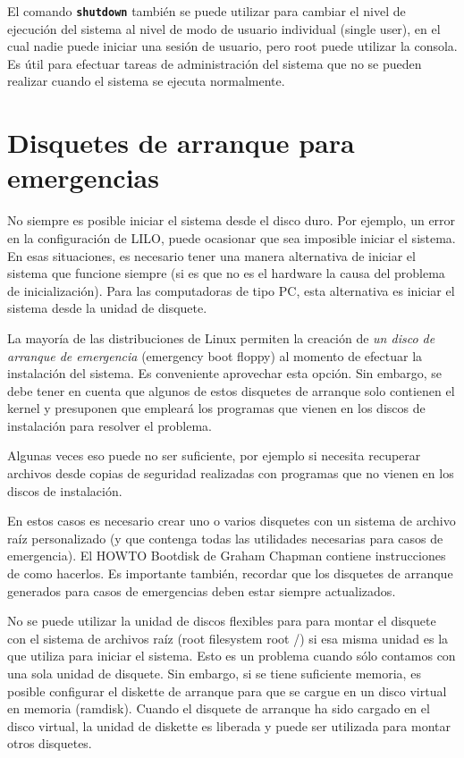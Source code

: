 \documentclass[12pt]{article}
\begin{document}
 El comando \texttt{\textbf{shutdown}} también se puede utilizar para
cambiar el nivel de ejecución del sistema al nivel de modo de usuario individual
(single user), en el cual nadie puede iniciar una sesión de usuario, pero root
puede utilizar la consola. Es útil para efectuar tareas de administración del
sistema que no se pueden realizar cuando el sistema se ejecuta normalmente.




\section{ Disquetes de arranque para emergencias}


 No siempre es posible iniciar el sistema desde el disco duro. Por
ejemplo, un error en la configuración de LILO, puede ocasionar que sea imposible
iniciar el sistema. En esas situaciones, es necesario tener una manera
alternativa de iniciar el sistema que funcione siempre (si es que no es el
hardware la causa del problema de inicialización). Para las computadoras de tipo
PC, esta alternativa es iniciar el sistema desde la unidad de disquete.  

 La mayoría de las distribuciones de Linux permiten la creación de
\textit{un disco de arranque de emergencia} (emergency boot
floppy) al momento de efectuar la instalación del sistema. Es conveniente
aprovechar esta opción. Sin embargo, se debe tener en cuenta que algunos de
estos disquetes de arranque solo contienen el kernel y presuponen que empleará
los programas que vienen en los discos de instalación para resolver el problema.


 Algunas veces eso puede no ser suficiente, por ejemplo si necesita
recuperar archivos desde copias de seguridad realizadas con programas que no
vienen en los discos de instalación.  

 En estos casos es necesario crear uno o varios disquetes con un sistema
de archivo raíz personalizado (y que contenga todas las utilidades necesarias
para casos de emergencia). El HOWTO Bootdisk de Graham Chapman contiene
instrucciones de como hacerlos. Es importante también, recordar que los
disquetes de arranque generados para casos de emergencias deben estar siempre
actualizados.  

 No se puede utilizar la unidad de discos flexibles para para montar el
disquete con el sistema de archivos raíz (root filesystem root /) si esa misma
unidad es la que utiliza para iniciar el sistema. Esto es un problema cuando
sólo contamos con una sola unidad de disquete. Sin embargo, si se tiene
suficiente memoria, es posible configurar el diskette de arranque para que se
cargue en un disco virtual en memoria (ramdisk). Cuando el disquete de arranque
ha sido cargado en el disco virtual, la unidad de diskette es liberada y puede
ser utilizada para montar otros disquetes.  
\end{document}
